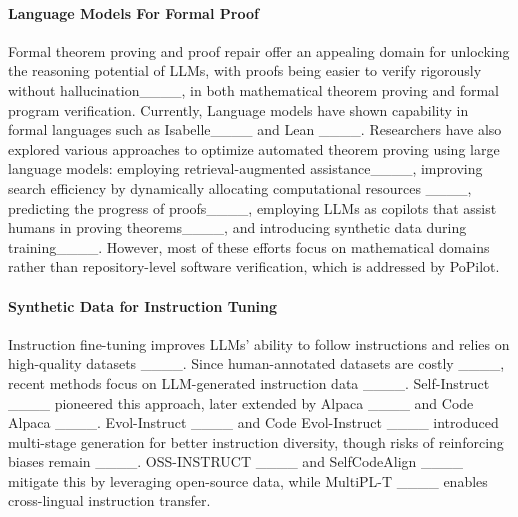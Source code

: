 
\paragraph{Language Models For Formal Proof}
Formal theorem proving and proof repair offer an appealing domain for unlocking the reasoning potential of LLMs, with proofs being easier to verify rigorously without hallucination____, in both mathematical theorem proving and formal program verification. Currently, Language models have shown capability in formal languages such as Isabelle____ and Lean ____. Researchers have also explored various approaches to optimize automated theorem proving using large language models: employing retrieval-augmented assistance____, improving search efficiency by dynamically allocating computational resources ____, predicting the progress of proofs____, employing LLMs as copilots that assist humans in proving theorems____, and introducing synthetic data during training____. However, most of these efforts focus on mathematical domains rather than repository-level software verification, which is addressed by PoPilot.

\paragraph{Synthetic Data for Instruction Tuning}
Instruction fine-tuning improves LLMs' ability to follow instructions and relies on high-quality datasets ____. Since human-annotated datasets are costly ____, recent methods focus on LLM-generated instruction data ____. Self-Instruct ____ pioneered this approach, later extended by Alpaca ____ and Code Alpaca ____. Evol-Instruct ____ and Code Evol-Instruct ____ introduced multi-stage generation for better instruction diversity, though risks of reinforcing biases remain ____. OSS-INSTRUCT ____ and SelfCodeAlign ____ mitigate this by leveraging open-source data, while MultiPL-T ____ enables cross-lingual instruction transfer.




